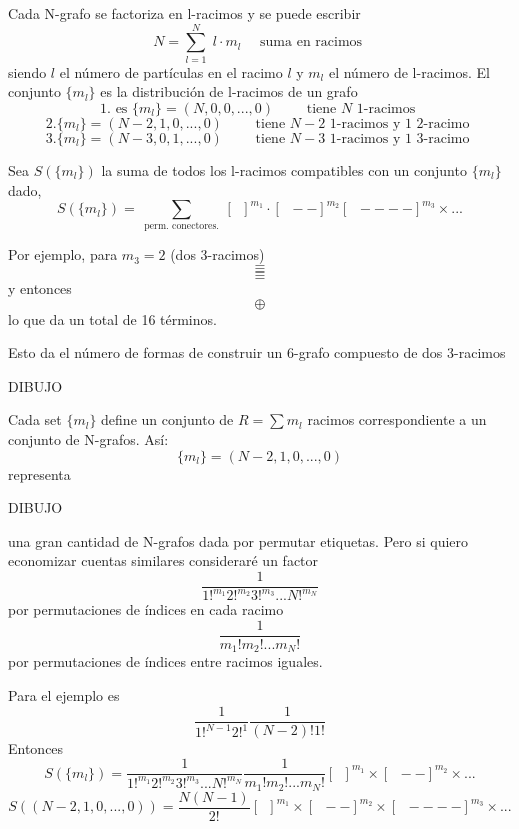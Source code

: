 \documentclass[10pt,oneside]{CBFT_book}
\begin{document}
Cada N-grafo se factoriza en l-racimos y se puede escribir 
\[
	N = \sum_{l=1}^N  \; l \cdot m_l \quad \text{ suma en racimos }
\]
siendo $l$ el número de partículas en el racimo $l$ y $m_l$ el número de l-racimos. 
El conjunto $ \{ m_l \} $ es la distribución de l-racimos de un grafo
\[
	1. \text{ es } \{ m_l \} = ( N, 0, 0 , ..., 0 ) \qquad \text{ tiene $N$ 1-racimos }
\]
\[
	2.  \{ m_l \} = ( N-2, 1, 0 , ..., 0 ) \qquad \text{ tiene $N-2$ 1-racimos y $1$ 2-racimo }
\]
\[
	3. \{ m_l \} = ( N-3, 0, 1 , ..., 0 ) \qquad \text{ tiene $N-3$ 1-racimos y $1$ 3-racimo }
\]
\notamargen{ \[ N = N\cdot 1 \] \[ N = (N-2)\cdot 1 + 1 \cdot 2 \] \[ N = 1\cdot(N-3) + 3\cdot 1\]}

Sea $ S( \{ m_l \} ) $ la suma de todos los l-racimos compatibles con un conjunto $ \{ m_l \}$ dado,
\[
	S( \{ m_l \} ) = \sum_{\text{ perm. conectores. }} \left[ \boxed{ \phantom{a} } \right]^{m_1} \cdot 
	\left[ \boxed{ \phantom{a} }-- \right]^{m_2} \left[ \boxed{ \phantom{a} } ---- \right]^{m_3} \times ...
\]

Por ejemplo, para $m_3=2$ (dos 3-racimos)
\[
	\equiv 
\]
\[
	\equiv 
\]
y entonces 
\[
	\oplus
\]
lo que da un total de 16 términos.

Esto da el número de formas de construir un 6-grafo compuesto de dos 3-racimos

DIBUJO

Cada set $ \{ m_l \} $ define un conjunto de $ R = \sum m_l $ racimos correspondiente a un conjunto de 
N-grafos. Así:
\[
	\{ m_l \} = ( N-2, 1, 0, ..., 0 )
\]
representa

DIBUJO 

una gran cantidad de N-grafos dada por permutar etiquetas. Pero si quiero economizar cuentas similares consideraré
un factor 
\[
	\frac{1}{ 1!^{m_1} 2!^{m_2} 3!^{m_3} ... N!^{m_N} }
\]
por permutaciones de índices en cada racimo 
\[
	\frac{1}{ m_1! m_2! ... m_N! }
\]
por permutaciones de índices entre racimos iguales.

Para el ejemplo es 
\[
	\frac{1}{1!^{N-1} 2!^1} \frac{1}{(N-2)! 1!}
\]
Entonces
\[
	S( \{ m_l \} ) = \frac{1}{ 1!^{m_1} 2!^{m_2} 3!^{m_3} ... N!^{m_N} } \frac{1}{ m_1! m_2! ... m_N! }
	\left[ \boxed{ \phantom{a} } \right]^{m_1} \times \left[ \boxed{ \phantom{a} }-- \right]^{m_2} \times ...
\]
\[
	S( ( N-2, 1, 0, ..., 0 ) ) = \frac{ N(N-1) }{2!}
	\left[ \boxed{ \phantom{a} } \right]^{m_1} \times \left[ \boxed{ \phantom{a} }-- \right]^{m_2} \times
	\left[ \boxed{ \phantom{a} } ---- \right]^{m_3} \times ...
\]
\end{document}
